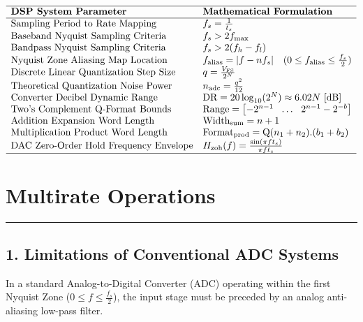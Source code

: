 \documentclass[
]{article}
\begin{document}
\[\begin{array}{ll}
\hline
\textbf{DSP System Parameter} & \textbf{Mathematical Formulation} \\ \hline
\text{Sampling Period to Rate Mapping} & f_s = \frac{1}{t_s} \\
\text{Baseband Nyquist Sampling Criteria} & f_s > 2 f_{\max} \\
\text{Bandpass Nyquist Sampling Criteria} & f_s > 2 (f_h - f_l) \\
\text{Nyquist Zone Aliasing Map Location} & f_{\text{alias}} = |f - n f_s| \quad (0 \le f_{\text{alias}} \le \frac{f_s}{2}) \\
\text{Discrete Linear Quantization Step Size} & q = \frac{V_{\text{FS}}}{2^N} \\
\text{Theoretical Quantization Noise Power} & n_{\text{adc}} = \frac{q^2}{12} \\
\text{Converter Decibel Dynamic Range} & \text{DR} = 20 \log_{10}(2^N) \approx 6.02 N\ \text{[dB]} \\
\text{Two's Complement Q-Format Bounds} & \text{Range} = \left[ -2^{n-1} \ \ \dots \ \ 2^{n-1} - 2^{-b} \right] \\
\text{Addition Expansion Word Length} & \text{Width}_{\text{sum}} = n + 1 \\
\text{Multiplication Product Word Length} & \text{Format}_{\text{prod}} = \text{Q}(n_1 + n_2).(b_1 + b_2) \\
\text{DAC Zero-Order Hold Frequency Envelope} & H_{\text{zoh}}(f) = \frac{\sin(\pi f t_s)}{\pi f t_s} \\ \hline
\end{array}\]

\section{Multirate Operations}\label{multirate-operations}

\begin{center}\rule{0.5\linewidth}{0.5pt}\end{center}

\subsection{1. Limitations of Conventional ADC
Systems}\label{limitations-of-conventional-adc-systems}

In a standard Analog-to-Digital Converter (ADC) operating within the
first Nyquist Zone (\(0 \le f \le \frac{f_s}{2}\)), the input stage must
be preceded by an analog anti-aliasing low-pass filter.
\end{document}
